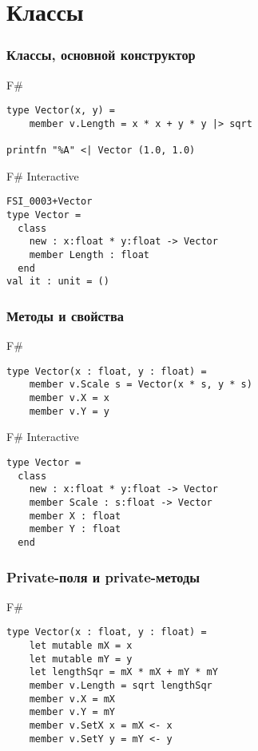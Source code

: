 \documentclass[xetex,mathserif,serif]{beamer}
\begin{document}
	\section{Классы}
 
	\begin{frame}[fragile]
		\frametitle{Классы, основной конструктор}
		\begin{exampleblock}{F\#}
			\begin{verbatim}
type Vector(x, y) = 
    member v.Length = x * x + y * y |> sqrt

printfn "%A" <| Vector (1.0, 1.0)
			\end{verbatim}
		\end{exampleblock}

		\begin{alertblock}{F\# Interactive}
			\begin{verbatim}
FSI_0003+Vector
type Vector =
  class
    new : x:float * y:float -> Vector
    member Length : float
  end
val it : unit = ()
			\end{verbatim}
		\end{alertblock}
\end{frame}

	\begin{frame}[fragile]
		\frametitle{Методы и свойства}
		\begin{exampleblock}{F\#}
			\begin{verbatim}
type Vector(x : float, y : float) = 
    member v.Scale s = Vector(x * s, y * s)
    member v.X = x
    member v.Y = y
			\end{verbatim}
		\end{exampleblock}

		\begin{alertblock}{F\# Interactive}
			\begin{verbatim}
type Vector =
  class
    new : x:float * y:float -> Vector
    member Scale : s:float -> Vector
    member X : float
    member Y : float
  end
			\end{verbatim}
		\end{alertblock}
\end{frame}

	\begin{frame}[fragile]
		\frametitle{Private-поля и private-методы}
		\begin{exampleblock}{F\#}
			\begin{verbatim}
type Vector(x : float, y : float) = 
    let mutable mX = x
    let mutable mY = y
    let lengthSqr = mX * mX + mY * mY
    member v.Length = sqrt lengthSqr
    member v.X = mX
    member v.Y = mY
    member v.SetX x = mX <- x
    member v.SetY y = mY <- y
			\end{verbatim}
		\end{exampleblock}
\end{frame}
\end{document}
